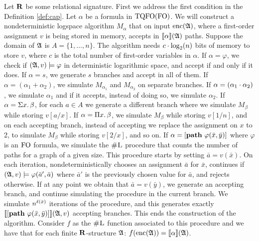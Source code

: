 Let $\mathbf{R}$ be some relational signature.  First we address the first condition in the Definition \ref{def:cap}. Let $\alpha$ be a formula in ${\rm TQFO}({\rm FO})$. We will construct a nondeterministic logspace algorithm $M_{\alpha}$ that on input ${\rm enc}(\mathfrak{A})$, where a first-order assignment $v$ is being stored in memory, accepts in ${\llbracket{}{\alpha}\rrbracket}(\mathfrak{A})$ paths. Suppose the domain of $\mathfrak{A}$ is $A = \{1,\ldots,n\}$. The algorithm needs $c\cdot\log_2(n)$ bits of memory to store $v$, where $c$ is the total number of first-order variables in $\alpha$. If $\alpha = \varphi$, we check if $(\mathfrak{A},v)\models\varphi$ in deterministic logarithmic space, and accept if and only if it does. If $\alpha = s$, we generate $s$ branches and accept in all of them. If $\alpha = (\alpha_1 + \alpha_2)$, we simulate $M_{\alpha_1}$ and $M_{\alpha_2}$ on separate branches. If $\alpha = (\alpha_1\cdot\alpha_2)$, we simulate $\alpha_1$ and if it accepts, instead of doing so, we simulate $\alpha_2$. If $\alpha = \Sigma{x}.\,\beta$, for each $a\in A$ we generate a different branch where we simulate $M_{\beta}$ while storing $v[a/x]$. If $\alpha = \Pi{x}.\,\beta$, we simulate $M_{\beta}$ while storing $v[1/n]$, and on each accepting branch, instead of accepting we replace the assignment on $x$ to 2, to simulate $M_{\beta}$ while storing $v[2/x]$, and so on. If $\alpha = [{\bf path} \,\, \varphi(\bar{x},\bar{y})]$ where $\varphi$ is an ${\rm FO}$ formula, we simulate the $\text{\sc \#L}$ procedure that counts the number of paths for a graph of a given size. This procedure starts by setting $\bar{a} = v(\bar{x})$. On each iteration, nondeterministically chooses an assignment $\bar{a}$ for $\bar{x}$, continues if $(\mathfrak{A},v)\models\varphi(\bar{a}',\bar{a})$ where $\bar{a}'$ is the previously chosen value for $\bar{a}$, and rejects otherwise. If at any point we obtain that $\bar{a} = v(\bar{y})$, we generate an accepting branch, and continue simulating the procedure in the current branch. We simulate $n^{\ell(\bar{x})}$ iterations of the procedure, and this generates exactly ${\llbracket{}{[{\bf path} \,\, \varphi(\bar{x},\bar{y})]}\rrbracket}(\mathfrak{A},v)$ accepting branches. This ends the construction of the algorithm. Consider $f$ as the $\text{\sc \#L}$ function associated to this procedure and we have that for each finite $\mathbf{R}$-structure $\mathfrak{A}$: $f({\rm enc}(\mathfrak{A})) = {\llbracket{}{\alpha}\rrbracket}(\mathfrak{A})$.

